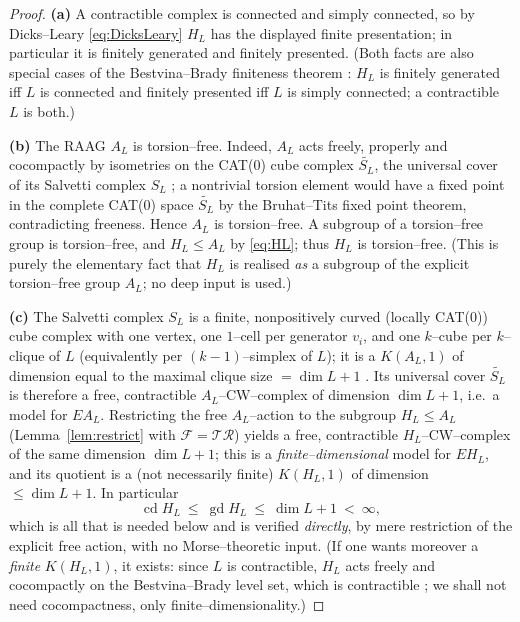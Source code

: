 \documentclass{amsart}
\theoremstyle{definition}
\newcommand{\gd}{\operatorname{gd}}
\newcommand{\cd}{\operatorname{cd}}
\newcommand{\AL}{A_{L}}
\newcommand{\HL}{H_{L}}
\begin{document}
\begin{proof}
\textbf{(a)} A contractible complex is connected and simply connected, so by Dicks--Leary
\eqref{eq:DicksLeary} $\HL$ has the displayed finite presentation; in particular it is finitely
generated and finitely presented. (Both facts are also special cases of the Bestvina--Brady
finiteness theorem \cite[Main Theorem]{BestvinaBrady}: $\HL$ is finitely generated iff $L$ is
connected and finitely presented iff $L$ is simply connected; a contractible $L$ is both.)

\textbf{(b)} The RAAG $\AL$ is torsion--free. Indeed, $\AL$ acts freely, properly and
cocompactly by isometries on the CAT(0) cube complex $\widetilde{S_L}$, the universal cover of
its Salvetti complex $S_L$ \cite[\S3]{Charney}; a nontrivial torsion element would have a
fixed point in the complete CAT(0) space $\widetilde{S_L}$ by the Bruhat--Tits fixed point
theorem, contradicting freeness. Hence $\AL$ is torsion--free. A subgroup of a torsion--free
group is torsion--free, and $\HL\le\AL$ by \eqref{eq:HL}; thus $\HL$ is torsion--free. (This is
purely the elementary fact that $\HL$ is realised \emph{as} a subgroup of the explicit
torsion--free group $\AL$; no deep input is used.)

\textbf{(c)} The Salvetti complex $S_L$ is a finite, nonpositively curved (locally CAT(0))
cube complex with one vertex, one $1$--cell per generator $v_i$, and one $k$--cube per
$k$--clique of $L$ (equivalently per $(k-1)$--simplex of $L$); it is a $K(\AL,1)$ of dimension
equal to the maximal clique size $=\dim L+1$ \cite[\S2--3]{Charney}. Its universal cover
$\widetilde{S_L}$ is therefore a free, contractible $\AL$--CW--complex of dimension $\dim L+1$,
i.e.\ a model for $E\AL$. Restricting the free $\AL$--action to the subgroup $\HL\le\AL$
(Lemma~\ref{lem:restrict} with $\mathcal F=\mathcal{TR}$) yields a free, contractible
$\HL$--CW--complex of the same dimension $\dim L+1$; this is a \emph{finite--dimensional} model
for $E\HL$, and its quotient is a (not necessarily finite) $K(\HL,1)$ of dimension $\le\dim
L+1$. In particular
\[
\cd\HL\ \le\ \gd\HL\ \le\ \dim L+1\ <\ \infty,
\]
which is all that is needed below and is verified \emph{directly}, by mere restriction of the
explicit free action, with no Morse--theoretic input. (If one wants moreover a \emph{finite}
$K(\HL,1)$, it exists: since $L$ is contractible, $\HL$ acts freely and cocompactly on the
Bestvina--Brady level set, which is contractible \cite[\S1--4]{BestvinaBrady}; we shall not
need cocompactness, only finite--dimensionality.)
\end{proof}
\end{document}
